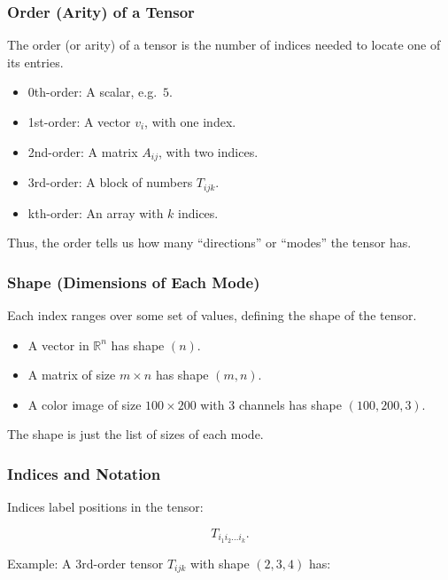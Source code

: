 \documentclass[
  letterpaper,
  DIV=11,
  numbers=noendperiod]{scrreprt}
\providecommand{\tightlist}{%
  \setlength{\itemsep}{0pt}\setlength{\parskip}{0pt}}
\begin{document}
\subsubsection{Order (Arity) of a Tensor}\label{order-arity-of-a-tensor}

The order (or arity) of a tensor is the number of indices needed to
locate one of its entries.

\begin{itemize}
\tightlist
\item
  0th-order: A scalar, e.g.~\(5\).
\item
  1st-order: A vector \(v_i\), with one index.
\item
  2nd-order: A matrix \(A_{ij}\), with two indices.
\item
  3rd-order: A block of numbers \(T_{ijk}\).
\item
  kth-order: An array with \(k\) indices.
\end{itemize}

Thus, the order tells us how many ``directions'' or ``modes'' the tensor
has.

\subsubsection{Shape (Dimensions of Each
Mode)}\label{shape-dimensions-of-each-mode}

Each index ranges over some set of values, defining the shape of the
tensor.

\begin{itemize}
\tightlist
\item
  A vector in \(\mathbb{R}^n\) has shape \((n)\).
\item
  A matrix of size \(m \times n\) has shape \((m,n)\).
\item
  A color image of size \(100 \times 200\) with 3 channels has shape
  \((100,200,3)\).
\end{itemize}

The shape is just the list of sizes of each mode.

\subsubsection{Indices and Notation}\label{indices-and-notation}

Indices label positions in the tensor:

\[
T_{i_1 i_2 \dots i_k}.
\]

Example: A 3rd-order tensor \(T_{ijk}\) with shape \((2,3,4)\) has:
\end{document}
